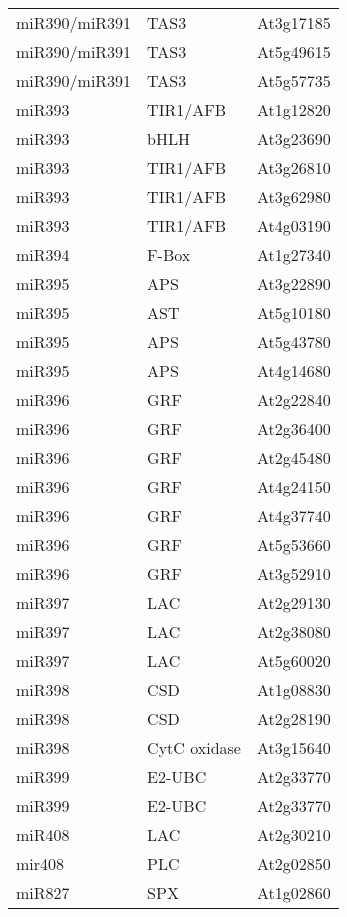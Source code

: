 \begin{table}
\begin{tabular}{lll}
miR390/miR391 & TAS3         & At3g17185 \\
miR390/miR391 & TAS3         & At5g49615 \\
miR390/miR391 & TAS3         & At5g57735 \\
miR393        & TIR1/AFB     & At1g12820 \\
miR393        & bHLH         & At3g23690 \\
miR393        & TIR1/AFB     & At3g26810 \\
miR393        & TIR1/AFB     & At3g62980 \\
miR393        & TIR1/AFB     & At4g03190 \\
miR394        & F-Box        & At1g27340 \\
miR395        & APS          & At3g22890 \\
miR395        & AST          & At5g10180 \\
miR395        & APS          & At5g43780 \\
miR395        & APS          & At4g14680 \\
miR396        & GRF          & At2g22840 \\
miR396        & GRF          & At2g36400 \\
miR396        & GRF          & At2g45480 \\
miR396        & GRF          & At4g24150 \\
miR396        & GRF          & At4g37740 \\
miR396        & GRF          & At5g53660 \\
miR396        & GRF          & At3g52910 \\
miR397        & LAC          & At2g29130 \\
miR397        & LAC          & At2g38080 \\
miR397        & LAC          & At5g60020 \\
miR398        & CSD          & At1g08830 \\
miR398        & CSD          & At2g28190 \\
miR398        & CytC oxidase & At3g15640 \\
miR399        & E2-UBC       & At2g33770 \\
miR399        & E2-UBC       & At2g33770 \\
miR408        & LAC          & At2g30210 \\
mir408        & PLC          & At2g02850 \\
miR827        & SPX          & At1g02860
\end{tabular}
\end{table}

